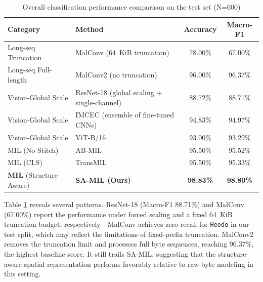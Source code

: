 \documentclass[runningheads]{llncs}
\begin{document}
\begin{table}[htbp]
\centering
\caption{Overall classification performance comparison on the test set (N=600)}
\footnotesize
\setlength{\tabcolsep}{2pt}
\begin{tabular}{@{}p{3.0cm}p{5.5cm}cc@{}}
\toprule
\textbf{Category}               & \textbf{Method}                                   & \textbf{Accuracy} & \textbf{Macro-F1} \\
\midrule
Long-seq Truncation             & MalConv \cite{raff2017malware} (64~KiB truncation)  & 78.00\%           & 67.00\%           \\
Long-seq Full-length            & MalConv2 \cite{raff2021classifying} (no truncation) & 96.00\%         & 96.37\%           \\
Vision-Global Scale             & ResNet-18 (global scaling + single-channel)      & 88.72\%           & 88.71\%           \\
Vision-Global Scale             & IMCEC \cite{vasan2020image} (ensemble of fine-tuned CNNs)       & 94.83\%           & 94.97\%           \\
Vision-Global Scale             & ViT-B/16 \cite{dosovitskiy2020image}              & 93.00\%           & 93.29\%           \\
MIL (No Stitch)                 & AB-MIL \cite{ilse2018attention}                   & 95.50\%           & 95.52\%           \\
MIL (CLS)                       & TransMIL \cite{shao2021transmil}                  & 95.50\%           & 95.33\%           \\
\textbf{MIL} (Structure-Aware) & \textbf{SA-MIL (Ours)}                            & \textbf{98.83\%}  & \textbf{98.80\%}  \\
\bottomrule
\end{tabular}
\label{tab:overall_performance}
\end{table}

Table \ref{tab:overall_performance} reveals several patterns. ResNet-18 (Macro-F1 88.71\%) and MalConv (67.00\%) report the performance under forced scaling and a fixed 64~KiB truncation budget, respectively---MalConv achieves zero recall for \texttt{Heodo} in our test split, which may reflect the limitations of fixed-prefix truncation. MalConv2 removes the truncation limit and processes full byte sequences, reaching 96.37\%, the highest baseline score. It still trails SA-MIL, suggesting that the structure-aware spatial representation performs favorably relative to raw-byte modeling in this setting.
\end{document}
